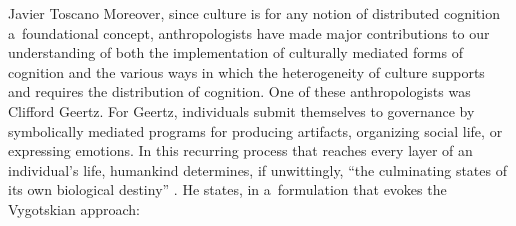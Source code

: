 \begin{artengenv}{Javier Toscano}
Moreover, since culture is for any notion of distributed cognition a~foundational concept, anthropologists have made major contributions to our understanding of both the implementation of culturally mediated forms of cognition and the various ways in which the heterogeneity of culture supports and requires the distribution of cognition. One of these anthropologists was Clifford Geertz. For Geertz, individuals submit themselves to governance by symbolically mediated programs for producing artifacts, organizing social life, or expressing emotions. In this recurring process that reaches every layer of an individual's life, humankind determines, if unwittingly, ``the culminating states of its own biological destiny''
\parencite[][p.48]{geertz_interpretation_1973}. %
 He states, in a~formulation that evokes the Vygotskian approach:



\end{artengenv}
